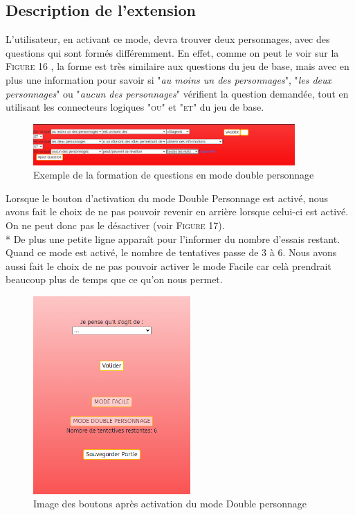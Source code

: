 \documentclass{article}
\begin{document}
        \subsection{Description de l'extension}
            L'utilisateur, en activant ce mode, devra trouver deux personnages, avec des questions qui sont formés différemment. En effet, comme on peut le voir sur la \textsc{Figure 16} , la forme est très similaire aux questions du jeu de base, mais avec en plus une information pour savoir si "\textsl{au moins un des personnages}", "\textsl{les deux personnages}" ou "\textsl{aucun des personnages}" vérifient la question demandée, tout en utilisant les connecteurs logiques "\textsc{ou}" et "\textsc{et}" du jeu de base.\\
            \begin{figure}[h]
                \centering
                \includegraphics[width=10cm]{images/QuestionExtension.png}
                \caption{Exemple de la formation de questions en mode double personnage}
            \end{figure}
            Lorsque le bouton d'activation du mode \textsf{Double Personnage} est activé, nous avons fait le choix de ne pas pouvoir revenir en arrière lorsque celui-ci est activé. On ne peut donc pas le désactiver (voir \textsc{Figure 17}).\\*
            De plus une petite ligne apparaît pour l'informer du nombre d'essais restant. Quand ce mode est activé, le nombre de tentatives passe de 3 à 6. Nous avons aussi fait le choix de ne pas pouvoir activer le mode \textsf{Facile} car celà prendrait beaucoup plus de temps que ce qu'on nous permet.\\
            
            \begin{figure}[h]
                \centering
                \includegraphics[width=6cm]{images/BoutonModeDoublePersonnage.png}
                \caption{Image des boutons après activation du mode \textsf{Double personnage}}
            \end{figure}
            
\end{document}
